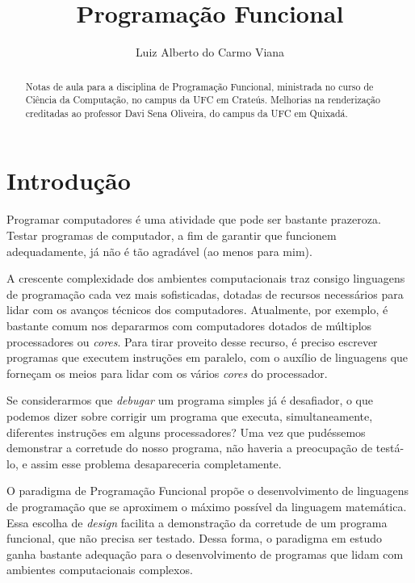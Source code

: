 \documentclass[a4paper]{article}
\begin{document}
\title{Programação Funcional}
\author{Luiz Alberto do Carmo Viana}

\maketitle

\begin{abstract}
  Notas de aula para a disciplina de Programação Funcional, ministrada
  no curso de Ciência da Computação, no campus da UFC em
  Crateús. Melhorias na renderização creditadas ao professor Davi Sena
  Oliveira, do campus da UFC em Quixadá.
\end{abstract}

\tableofcontents

\pagebreak

\section{Introdução}

Programar computadores é uma atividade que pode ser bastante prazeroza.
Testar programas de computador, a fim de garantir que funcionem adequadamente,
já não é tão agradável (ao menos para mim).

A crescente complexidade dos ambientes computacionais traz consigo linguagens de
programação cada vez mais sofisticadas, dotadas de recursos necessários para
lidar com os avanços técnicos dos computadores.
Atualmente, por exemplo, é bastante comum nos depararmos com computadores
dotados de múltiplos processadores ou \emph{cores}.
Para tirar proveito desse recurso, é preciso escrever programas que executem
instruções em paralelo, com o auxílio de linguagens que forneçam os meios para
lidar com os vários \emph{cores} do processador.

Se considerarmos que \emph{debugar} um programa simples já é desafiador, o que
podemos dizer sobre corrigir um programa que executa, simultaneamente,
diferentes instruções em alguns processadores?
Uma vez que pudéssemos demonstrar a corretude do nosso programa, não haveria a
preocupação de testá-lo, e assim esse problema desapareceria completamente.

O paradigma de Programação Funcional propõe o desenvolvimento de linguagens de
programação que se aproximem o máximo possível da linguagem matemática.
Essa escolha de \emph{design} facilita a demonstração da corretude de um
programa funcional, que não precisa ser testado.
Dessa forma, o paradigma em estudo ganha bastante adequação para o
desenvolvimento de programas que lidam com ambientes computacionais complexos.
\end{document}

